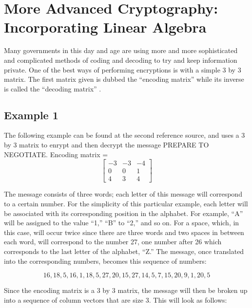 \documentclass{article}
\begin{document}
\section{More Advanced Cryptography: Incorporating Linear Algebra}
Many governments in this day and age are using more and more sophisticated and complicated methods of coding and decoding to try and keep information private. One of the best ways of performing encryptions is with a simple 3 by 3 matrix. The first matrix given is dubbed the “encoding matrix” while its inverse is called the “decoding matrix” \cite{ref4:4}.

\subsection{Example 1}
The following example can be found at the second reference source, and uses a 3 by 3 matrix to enrypt and then decrypt the message PREPARE TO NEGOTIATE.
{\center
Encoding matrix = 
$$
\begin{bmatrix}
-3 & -3 & -4 \\
0 & 0 & 1 \\
4 & 3 & 4 
\end{bmatrix}
$$
\endcenter}

\noindent
The message consists of three words; each letter of this message will correspond to a certain number. For the simplicity of this particular example, each letter will be associated with its corresponding position in the alphabet. For example, “A” will be assigned to the value “1,” “B” to “2,” and so on. For a space, which, in this case, will occur twice since there are three words and two spaces in between each word, will correspond to the number 27, one number after 26 which corresponds to the last letter of the alphabet, “Z.” The message, once translated into the corresponding numbers, becomes this sequence of numbers:

$$
16, 18, 5, 16, 1, 18, 5, 27, 20, 15, 27, 14, 5, 7, 15, 20, 9, 1, 20, 5
$$

\noindent
Since the encoding matrix is a 3 by 3 matrix, the message will then be broken up into a sequence of column vectors that are size 3. This will look as follows:
\end{document}
